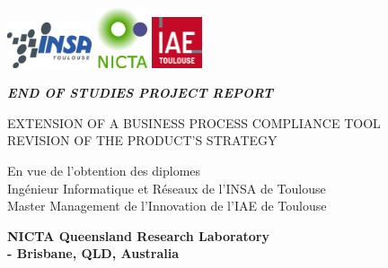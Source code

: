\documentclass[10pt]{report}
\begin{document}
\setlength{\parindent}{1em}
\def\labelitemi{--} %

\begin{titlepage}

\begin{center}

\includegraphics[width=2.5cm]{INSA-logo.jpg} \hspace{3cm}
\includegraphics[width=1.5cm]{NICTA-logo.jpg}\hspace{4cm}
\includegraphics[width=1.5cm]{IAE-logo.jpg} 

\vspace{3cm}
\textsc{\LARGE \textit{\textbf{\uppercase{End of studies project report}}}}
\vspace{1.5cm}

\begin{framed}
\LARGE \uppercase{Extension of a Business Process Compliance tool\\Revision of the Product's Strategy}
\end{framed}

\vspace{1cm}
\large En vue de l'obtention des diplomes \\
Ingénieur Informatique et Réseaux de l'INSA de Toulouse\\
Master Management de l'Innovation de l'IAE de Toulouse

\end{center}
\vspace{1.5cm}
\begin{flushright}
\textbf{\large  NICTA Queensland Research Laboratory\\ \hspace{.5cm}- Brisbane, QLD, Australia}
\end{flushright}


\end{titlepage}
\end{document}

